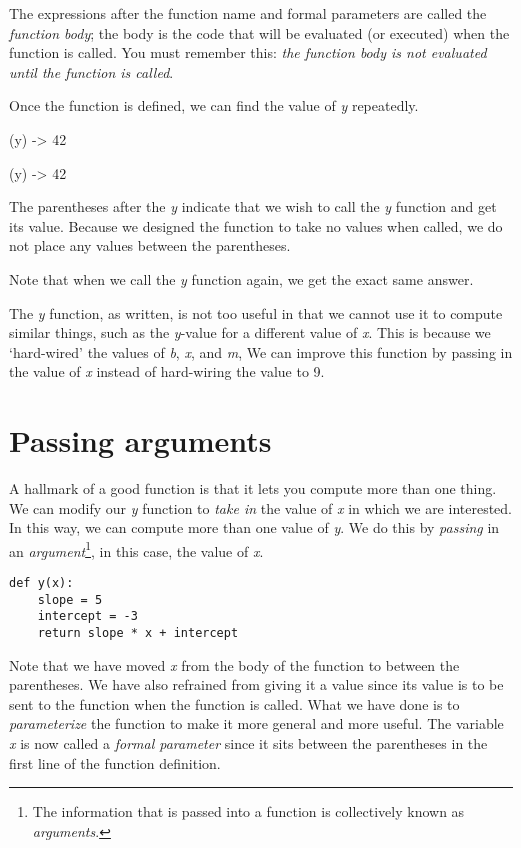 The expressions after the function name and formal parameters
are called the {\it function body}; the body
is the code that will be evaluated (or executed) when the
function is called. You must remember this: {\it the function body
is not evaluated until the function is called}.

Once the function is defined, we can find the value of {\it y} repeatedly.

    (y)
    -> 42

    (y)
    -> 42

The parentheses after the {\it y} indicate that we wish to call
the {\it y} function and get its value. Because we designed the
function to take no values when called, we do not place any
values between the parentheses.

Note that when we call the {\it y} function again,
we get the exact same answer.

The {\it y} function, as written,
is not too useful in that we cannot use it to compute
similar things, such as the {\it y}-value for a different value of
{\it x}.
This is because we `hard-wired' the values of {\it b}, {\it x}, and {\it m},
We can improve this function by passing in the value of {\it x}
instead of hard-wiring the value to 9.

\section{Passing arguments}

A hallmark of a good function is that it lets you compute
more than one thing. We can modify our {\it y} function to {\it take in} the
value of {\it x} in which we are interested.
In this way,
we can compute more than one value of {\it y}.
We do this by {\it passing} in 
an {\it argument}\footnote{
The information that is passed into a function is collectively
known as {\it arguments}.}, in this case, the value of {\it x}.

\begin{verbatim}
def y(x):
    slope = 5
    intercept = -3
    return slope * x + intercept
\end{verbatim}

Note that we have moved {\it x} from the body of the function
to between the parentheses. We have also refrained from
giving it a value since its value is to be sent to the function
when the function is called.
What we have done is to {\it parameterize} the function to make it more
general and more useful. The variable {\it x} is now called a
{\it formal parameter} since it sits between the parentheses in
the first line of the function definition.

